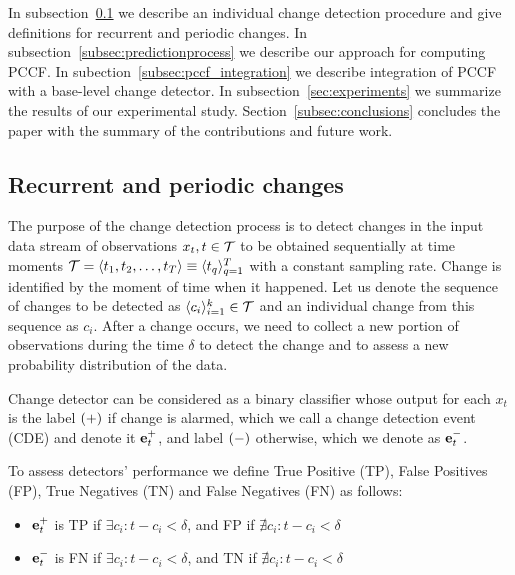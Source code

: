In subsection~\ref{subsec:chpprocess} we describe an individual change detection procedure and give definitions for recurrent and periodic changes.
In subsection~\ref{subsec:predictionprocess} we describe our approach for computing PCCF.
In subection~\ref{subsec:pccf_integration} we describe integration of PCCF with a base-level change detector.
In subsection~\ref{sec:experiments} we summarize the results of our experimental study.
Section~\ref{subsec:conclusions} concludes the paper with the summary of the contributions and future work.

\subsection{Recurrent and periodic changes}
\label{subsec:chpprocess}

The purpose of the change detection process is to detect changes in the input data stream of observations $x_t, t \in \mathcal{T}$ to be obtained sequentially at time moments $\mathcal{T}=\langle t_1,t_2,\dots,t_T \rangle \equiv \langle t_q \rangle_{q=1}^T$ with a constant sampling rate.
Change is identified by the moment of time when it happened.
Let us denote the sequence of changes to be detected as $\langle c_i  \rangle_{i=1}^k \in \mathcal{T}$ and an individual change from this sequence as $c_i$.
After a change occurs, we need to collect a new portion of observations during the time $\delta$ to detect the change and to assess a new probability distribution of the data.

Change detector can be considered as a binary classifier whose output for each $x_t$ is the label $(+)$ if change is alarmed, which we call a change detection event (CDE) and denote it $\mathbf{e}_{t}^{+}$, and label $(-)$ otherwise, which we denote as  $\mathbf{e}_{t}^{-}$.

To assess detectors' performance we define True Positive (TP), False Positives (FP), True Negatives (TN) and False Negatives (FN) as follows:
\begin{itemize}[leftmargin=*]\setlength\itemsep{0em}
    \item $\mathbf{e}_{t}^{+}$ is TP if $\exists c_i:t-c_i<\delta$, and FP if $\nexists c_i:t-c_i<\delta$
    \item $\mathbf{e}_{t}^{-}$ is FN if $\exists c_i:t-c_i <\delta$, and TN if $\nexists c_i:t-c_i<\delta$
\end{itemize}

